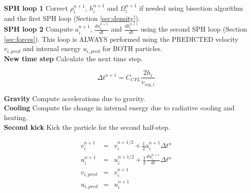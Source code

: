 \documentclass[a4paper,10pt]{report}
\begin{document}
\textbf{SPH loop 1} Correct $\rho_i^{n+1}$, $h_i^{n+1}$ and $\Omega_i^{n+1}$ if needed using bisection algorithm and the
first SPH loop (Section \ref{sec:density}). \\

\textbf{SPH loop 2} Compute $a_i^{n+1}$, $\frac{du_i^{n+1}}{dt}$ and $\frac{dh_i^{n+1}}{dt}$ using the second SPH
loop (Section \ref{sec:forces}). This loop is ALWAYS performed using the PREDICTED velocity $v_{i,pred}$ and internal
energy $u_{i,pred}$ for BOTH particles. \\

\textbf{New time step} Calculate the next time step.

\begin{equation*}
 \Delta t^{n+1} = C_{CFL} \frac{2h_i}{v_{sig,i}}
\end{equation*}


\textbf{Gravity} Compute accelerations due to gravity. \\

\textbf{Cooling} Compute the change in internal energy due to radiative cooling and heating. \\

\textbf{Second kick} Kick the particle for the second half-step.

\begin{eqnarray*}
 v_i^{n+1} &=& v_i^{n+1/2} + \frac{1}{2} a_i^{n+1}\Delta t^{n} \\
 u_i^{n+1} &=& u_i^{n+1/2} + \frac{1}{2} \frac{du_i^{n+1}}{dt}\Delta t^{n} \\
 v_{i,pred} &=& v_i^{n+1} \\
 u_{i,pred} &=& u_i^{n+1} \\
\end{eqnarray*}
\end{document}
